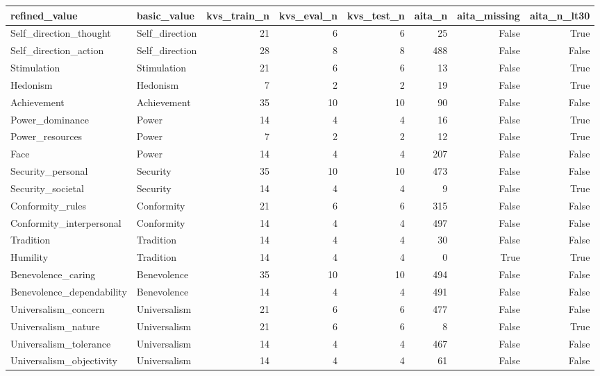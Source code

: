 \begin{tabular}{llrrrrrr}
\toprule
refined\_value & basic\_value & kvs\_train\_n & kvs\_eval\_n & kvs\_test\_n & aita\_n & aita\_missing & aita\_n\_lt30 \\
\midrule
Self\_direction\_thought & Self\_direction & 21 & 6 & 6 & 25 & False & True \\
Self\_direction\_action & Self\_direction & 28 & 8 & 8 & 488 & False & False \\
Stimulation & Stimulation & 21 & 6 & 6 & 13 & False & True \\
Hedonism & Hedonism & 7 & 2 & 2 & 19 & False & True \\
Achievement & Achievement & 35 & 10 & 10 & 90 & False & False \\
Power\_dominance & Power & 14 & 4 & 4 & 16 & False & True \\
Power\_resources & Power & 7 & 2 & 2 & 12 & False & True \\
Face & Power & 14 & 4 & 4 & 207 & False & False \\
Security\_personal & Security & 35 & 10 & 10 & 473 & False & False \\
Security\_societal & Security & 14 & 4 & 4 & 9 & False & True \\
Conformity\_rules & Conformity & 21 & 6 & 6 & 315 & False & False \\
Conformity\_interpersonal & Conformity & 14 & 4 & 4 & 497 & False & False \\
Tradition & Tradition & 14 & 4 & 4 & 30 & False & False \\
Humility & Tradition & 14 & 4 & 4 & 0 & True & True \\
Benevolence\_caring & Benevolence & 35 & 10 & 10 & 494 & False & False \\
Benevolence\_dependability & Benevolence & 14 & 4 & 4 & 491 & False & False \\
Universalism\_concern & Universalism & 21 & 6 & 6 & 477 & False & False \\
Universalism\_nature & Universalism & 21 & 6 & 6 & 8 & False & True \\
Universalism\_tolerance & Universalism & 14 & 4 & 4 & 467 & False & False \\
Universalism\_objectivity & Universalism & 14 & 4 & 4 & 61 & False & False \\
\bottomrule
\end{tabular}
